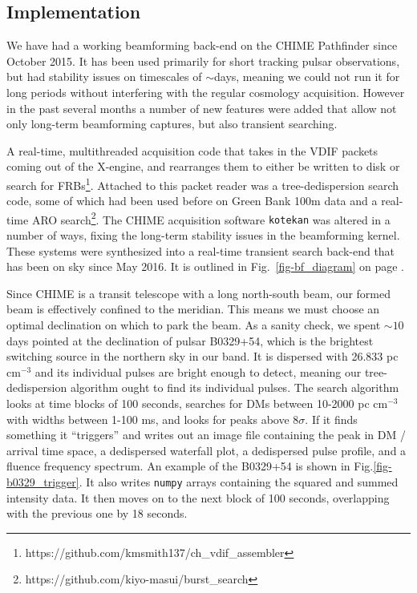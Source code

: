 \subsection{Implementation}

We have had a working beamforming back-end on the CHIME 
Pathfinder since October 2015. It has been used primarily 
for short tracking pulsar observations, but had stability issues 
on timescales of $\sim$days, meaning we could not run it 
for long periods without interfering with the regular cosmology acquisition. 
However in the past several months a number of new features 
were added that allow not only long-term beamforming captures, 
but also transient searching. 
 
A real-time, multithreaded acquisition code that takes in the VDIF 
packets coming out of the X-engine, and rearranges them to either be written to disk or search for 
FRBs\footnote{https://github.com/kmsmith137/ch\_vdif\_assembler}. Attached 
to this packet reader was a tree-dedispersion search code, some of 
which had been used before on Green Bank 100m data and a real-time ARO 
search\footnote{https://github.com/kiyo-masui/burst\_search}.
The CHIME acquisition software {\tt kotekan} was 
altered in a number of ways, fixing the long-term 
stability issues in the beamforming kernel. These systems 
were synthesized into a real-time transient search back-end 
that has been on sky since May 2016. 
It is outlined in Fig.~\ref{fig-bf_diagram}
on page \pageref{fig-bf_diagram}. 

Since CHIME is a transit telescope with a long north-south beam, 
our formed beam is effectively confined to the meridian. This means
we must choose an optimal declination on which 
to park the beam. As a sanity check, we spent $\sim10$ 
days pointed 
at the declination of pulsar B0329+54, which is the 
brightest switching source in the northern sky in our band. It 
is dispersed with 26.833 pc cm$^{-3}$ and its individual 
pulses are bright enough to detect, meaning our tree-dedispersion 
algorithm ought to find its individual pulses. The search 
algorithm looks at time blocks of 100 seconds, searches 
for DMs between 10-2000 pc cm$^{-3}$ with widths between 
1-100 ms, and looks for peaks above 8$\sigma$. If it finds something
it ``triggers'' and writes out an image file containing the peak 
in DM / arrival time space, a dedispersed waterfall plot, a dedispersed 
pulse profile, and a fluence frequency spectrum. An example 
of the B0329+54 is shown in Fig.\ref{fig-b0329_trigger}. It also 
writes {\tt numpy} arrays containing the squared and summed 
intensity data. It then moves on to the next block of 100 seconds, 
overlapping with the previous one by 18 seconds. 


